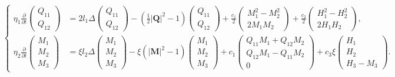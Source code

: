 \documentclass{article}
\def\Qvec{\mathbf{Q}}
\def \Mvec{\mathbf{M}}
\begin{document}
\begin{eqnarray}
\left\{ \begin{aligned}
\eta_1\frac{\partial}{\partial t}\begin{pmatrix}
Q_{11}\\
Q_{12}
\end{pmatrix} &= 2l_1\Delta \begin{pmatrix}
Q_{11}\\
Q_{12}
\end{pmatrix} - \left(\frac{1}{2}|\Qvec|^2 -1\right)\begin{pmatrix}
Q_{11}\\
Q_{12}
\end{pmatrix} + \frac{c_1}{2}\begin{pmatrix}
M_1^2 - M_2^2\\
2M_1M_2
\end{pmatrix}+ \frac{c_2}{2}\begin{pmatrix}
H_1^2 - H_2^2\\
2H_1H_2
\end{pmatrix},\\
\eta_2\frac{\partial}{\partial t}\begin{pmatrix}
M_1\\
M_2\\
M_3
\end{pmatrix}&= \xi l_2\Delta \begin{pmatrix}
M_1\\
M_2\\
M_3
\end{pmatrix} - \xi\left(|\Mvec|^2-1\right)\begin{pmatrix}
M_1\\
M_2\\
M_3
\end{pmatrix} + c_1\begin{pmatrix}
Q_{11}M_1 + Q_{12}M_2\\
Q_{12}M_1 - Q_{11}M_2\\
0
\end{pmatrix}
+ c_3\xi\begin{pmatrix}
H_1\\
H_2\\
H_3-M_3
\end{pmatrix}.
\end{aligned}\right.\nonumber\\ \label{eq:26}
\end{eqnarray}
\end{document}
